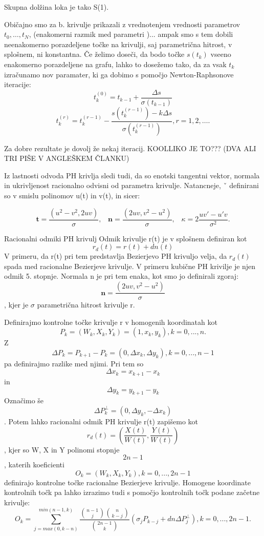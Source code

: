 \documentclass[12pt]{article}
\begin{document}
Skupna dolžina loka je tako S(1). 

Običajno smo za  b. krivulje prikazali z vrednotenjem vrednosti parametrov  $t_0,\ldots , t_N$,
(enakomerni razmik med parametri )... 
ampak smo s tem dobili neenakomerno porazdeljene točke na krivulji, saj parametrična 
hitrost, v splošnem, ni konstantna.
Če želimo doseči, da bodo točke $s(t_k)$ vseeno enakomerno porazdeljene na grafu,
lahko to dosežemo tako, da za vsak $t_k$ izračunamo nov paramater, ki ga dobimo 
s pomočjo Newton-Raphsonove iteracije: 
$$t^{(0)}_k = t_{k-1}+\frac{\Delta s}{\sigma(t_{k-1})}$$
$$t^{(r)}_k = t^{(r-1)}_k-\frac{s(t^{(r-1)}_k)-k\Delta s}{\sigma(t^{(r-1)}_k)}, r = 1, 2,\ldots.$$

Za dobre rezultate je dovolj že nekaj iteracij. KOOLLIKO JE TO??? (DVA ALI TRI PIŠE V ANGLEŠKEM ČLANKU)

Iz lastnosti odvoda PH krivlja sledi tudi, da so enotski tangentni vektor,
normala in ukrivljenost racionalno odvisni od parametra krivulje. Natancneje, ˇ
definirani so v smislu polinomov u(t) in v(t), in sicer: 

$$\textbf{t} =\frac{(u^2 - v^2, 2uv)}{\sigma},\hspace{10pt} \textbf{n} =\frac{(2uv, v^2 - u^2)}{\sigma},\hspace{10pt} \kappa = 2 \frac{uv\prime - u\prime v}{\sigma^2}.$$

Racionalni odmiki PH krivulj
Odmik krivulje r(t) je v splošnem definiran kot
$$ r_d(t) = r(t) + dn(t)$$
V primeru, da r(t) pri tem predstavlja Bezierjevo PH krivuljo velja, 
da $r_d(t)$ spada med racionalne Bezierjeve krivulje. V primeru kubične PH krivilje 
je njen odmik 5. stopnje. Normala n je pri tem enaka, kot smo jo definirali zgoraj:
$$\textbf{n} =\frac{(2uv, v^2 - u^2)}{\sigma}$$,
kjer je $\sigma$ parametrična hitrost krivulje r.

Definirajmo kontrolne točke krivulje r v homogenih koordinatah kot
$$ P_k = (W_k, X_k, Y_k) = (1, x_k, y_k), k = 0, ..., n.$$
Z $$\Delta P_k = P_{k+1}-P_k = (0, \Delta x_k, \Delta y_k), k = 0, ..., n-1$$ 
pa definirajmo razlike med njimi. Pri tem so $$\Delta x_k = x_{k+1} - x_k$$ in $$\Delta y_k = y_{k+1} - y_k$$
Označimo še $$ \Delta P_k^{\perp} = (0, \Delta y_k, - \Delta x_k)$$. Potem lahko
racionalni odmik PH krivulje r(t) zapišemo kot
$$ r_d(t) = (\frac{X(t)}{W(t)}, \frac{Y(t)}{W(t)})$$,
kjer so W, X in Y polinomi stopnje $$2n -1$$, katerih koeficienti 
$$ O_k = (W_k, X_k, Y_k), k = 0, ..., 2n-1$$
definirajo kontrolne točke racionalne Bezierjeve krivulje. 
Homogene koordinate kontrolnih točk pa lahko izrazimo tudi s pomočjo kontrolnih točk podane začetne krivulje:
$$ O_k = \sum_{j=max(0,k-n)}^{min(n-1,k)}{\frac{\binom{n-1}{j}\binom{n}{k-j}}{\binom{2n-1}{k}}(\sigma_j P_{k-j}+d n \Delta P^{\perp}_{j})}, k = 0, ..., 2n-1.$$
\end{document}
